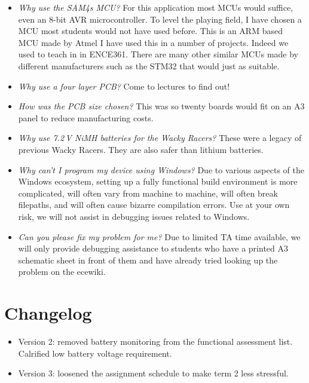 \documentclass[11pt, a4paper]{article}
\begin{document}
\begin{itemize}
\item \emph{Why use the SAM4s MCU?}  For this application most MCUs
  would suffice, even an 8-bit AVR microcontroller.  To level the
  playing field, I have chosen a MCU most students would not have used
  before.  This is an ARM based MCU made by Atmel I have used this in
  a number of projects.  Indeed we used to teach in in ENCE361.  There
  are many other similar MCUs made by different manufacturers such as
  the STM32 that would just as suitable.

\item \emph{Why use a four layer PCB?}  Come to lectures to find out!

\item \emph{How was the PCB size chosen?}  This was so twenty boards
  would fit on an A3 panel to reduce manufacturing costs.

\item \emph{Why use 7.2\,V NiMH batteries for the Wacky Racers?}
  These were a legacy of previous Wacky Racers.  They are also safer
  than lithium batteries.

\item \emph{Why can't I program my device using Windows?} Due to various aspects
of the Windows ecosystem, setting up a fully functional build environment is
more complicated, will often vary from machine to machine, will often break
filepaths, and will often cause bizarre compilation errors. Use at your own
risk, we will not assist in debugging issues related to Windows.

\item \emph{Can you please fix my problem for me?} Due to limited TA time
available, we will only provide debugging assistance to students who have a
printed A3 schematic sheet in front of them and have already tried looking up
the problem on the ecewiki.

\end{itemize}

\section{Changelog}

\begin{itemize}
  \item Version 2: removed battery monitoring from the functional assessment
  list. Calrified low battery voltage requirement.

  \item Version 3: loosened the assignment schedule to make term 2 less
  stressful.
  
  \end{itemize}
\end{document}
